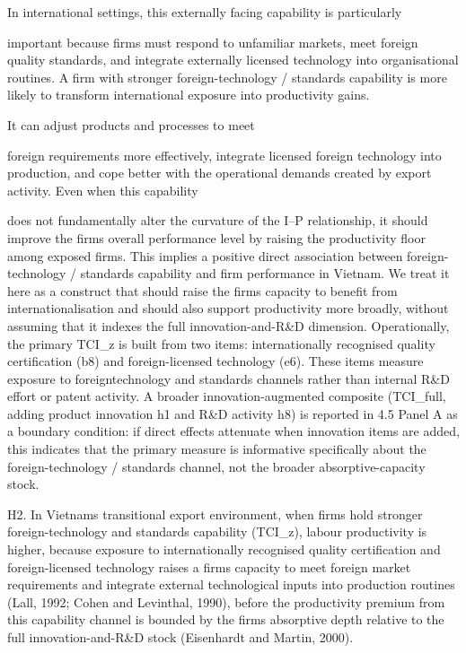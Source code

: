 \documentclass[12pt,a4paper]{article}
\begin{document}
In international settings, this externally facing capability is
particularly

important because firms must respond to unfamiliar markets, meet foreign
quality standards, and integrate externally licensed technology into
organisational routines. A firm with stronger foreign-technology /
standards capability is more likely to transform international exposure
into productivity gains.

It can adjust products and processes to meet

foreign requirements more effectively, integrate licensed foreign
technology into production, and cope better with the operational demands
created by export activity. Even when this capability

does not fundamentally alter the curvature of the I--P relationship, it
should improve the firm\textquotesingle s overall performance level by
raising the productivity floor among exposed firms. This implies a
positive direct association between foreign-technology / standards
capability and firm performance in Vietnam. We treat it here as a
construct that should raise the firm\textquotesingle s capacity to
benefit from internationalisation and should also support productivity
more broadly, without assuming that it indexes the full
innovation-and-R\&D dimension. Operationally, the primary TCI\_z is
built from two items: internationally recognised quality certification
(b8) and foreign-licensed technology (e6). These items measure exposure
to foreigntechnology and standards channels rather than internal R\&D
effort or patent activity. A broader innovation-augmented composite
(TCI\_full, adding product innovation h1 and R\&D activity h8) is
reported in 4.5 Panel A as a boundary condition: if direct effects
attenuate when innovation items are added, this indicates that the
primary measure is informative specifically about the foreign-technology
/ standards channel, not the broader absorptive-capacity stock.

H2. In Vietnam\textquotesingle s transitional export environment, when
firms hold stronger foreign-technology and standards capability
(TCI\_z), labour productivity is higher, because exposure to
internationally recognised quality certification and foreign-licensed
technology raises a firm\textquotesingle s capacity to meet foreign
market requirements and integrate external technological inputs into
production routines (Lall, 1992; Cohen and Levinthal, 1990), before the
productivity premium from this capability channel is bounded by the
firm\textquotesingle s absorptive depth relative to the full
innovation-and-R\&D stock (Eisenhardt and Martin, 2000).
\end{document}
